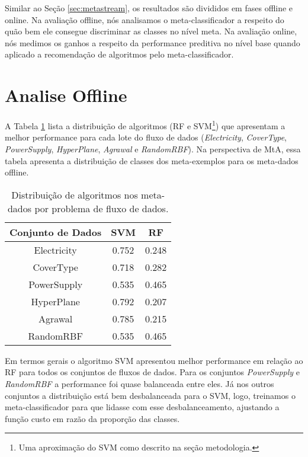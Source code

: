 Similar ao Seção \ref{sec:metastream}, os resultados são divididos em fases offline e online. Na avaliação offline, nós analisamos o meta-classificador a respeito do quão bem ele consegue discriminar as classes no nível meta. Na avaliação online, nós medimos os ganhos a respeito da performance preditiva no nível base quando aplicado a recomendação de algoritmos pelo meta-classificador.

\section{Analise Offline}

A Tabela \ref{tab:algo_dist} lista a distribuição de algoritmos (RF e SVM\footnote{Uma aproximação do SVM como descrito na seção metodologia.}) que apresentam a melhor performance para cada lote do fluxo de dados (\textit{Electricity}, \textit{CoverType}, \textit{PowerSupply}, \textit{HyperPlane}, \textit{Agrawal} e \textit{RandomRBF}). Na perspectiva de MtA, essa tabela apresenta a distribuição de classes dos meta-exemplos para os meta-dados offline.

\begin{table}[ht]
\caption{Distribuição de algoritmos nos meta-dados por problema de fluxo de dados.}
\label{tab:algo_dist}
\centering
\begin{tabular}{c|c|c} \hline
    Conjunto de Dados & SVM   & RF    \\ \hline
    Electricity       & 0.752 & 0.248 \\
    CoverType         & 0.718 & 0.282 \\
    PowerSupply       & 0.535 & 0.465 \\ \hline
    HyperPlane        & 0.792 & 0.207 \\
    Agrawal           & 0.785 & 0.215 \\
    RandomRBF         & 0.535 & 0.465 \\
\end{tabular}
\end{table}

Em termos gerais o algoritmo SVM apresentou melhor performance em relação ao RF para todos
os conjuntos de fluxos de dados. Para os conjuntos \textit{PowerSupply} e \textit{RandomRBF} a
performance foi quase balanceada entre eles. Já nos outros conjuntos a distribuição está bem
desbalanceada para o SVM, logo, treinamos o meta-classificador para que lidasse com esse
desbalanceamento,  ajustando a função custo em razão da proporção das classes. 


